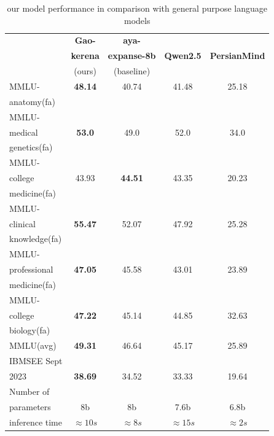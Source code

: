 \documentclass[conference]{IEEEtran}
\begin{document}
	\begin{table}[ht]
		\centering
		\caption{
			our model performance 
			in comparison with general purpose language models
		}
		\begin{tabular}{|l|c|c|c|c|}  %
			\hline
			\textbf{} & \textbf{Gao-} & \textbf{aya-} &  &  \\ 
			& \textbf{kerena} & \textbf{expanse-8b} & \textbf{Qwen2.5} & \textbf{PersianMind} \\
			& (ours) & (baseline) &  &  \\ \hline
			MMLU- & \textbf{48.14} & 40.74 & 41.48 & 25.18 \\ 
			anatomy(fa) &  &  &  &  \\ \hline
			MMLU- &  &  &  &  \\
			medical & \textbf{53.0} & 49.0 & 52.0 & 34.0 \\ 
			genetics(fa) &  &  &  &  \\ \hline
			MMLU- &  &  &  &  \\
			college & 43.93 & \textbf{44.51} & 43.35 & 20.23 \\
			medicine(fa) &  &  &  &  \\ \hline
			MMLU- &  &  &  &  \\
			clinical& \textbf{55.47} & 52.07 & 47.92 & 25.28 \\
			knowledge(fa)&  &  &  &  \\ \hline
			MMLU- &  &  &  &  \\
			professional& \textbf{47.05} & 45.58 & 43.01 & 23.89 \\ 
			medicine(fa)&  &  &  &  \\ \hline
			MMLU- &  &  &  &  \\
			college& \textbf{47.22} & 45.14 & 44.85 & 32.63 \\
			biology(fa)&  &  &  &  \\ \hline
			MMLU(avg) & \textbf{49.31} & 46.64 & 45.17 & 25.89 \\ \hline
			IBMSEE Sept &  &  &  &  \\ 
			2023 & \textbf{38.69} & 34.52 & 33.33 & 19.64 \\  \hline
			Number of&  &  &  &  \\
			parameters & 8b & 8b & 7.6b & 6.8b \\ \hline
			inference time & $\approx 10s$ & $\approx 8s$ & $\approx 15s$ & $\approx 2s$ \\  \hline
		\end{tabular}
		\label{tab:model_results_on_mcqa_vs_general_purpose_languages}
	\end{table}
	
\end{document}
